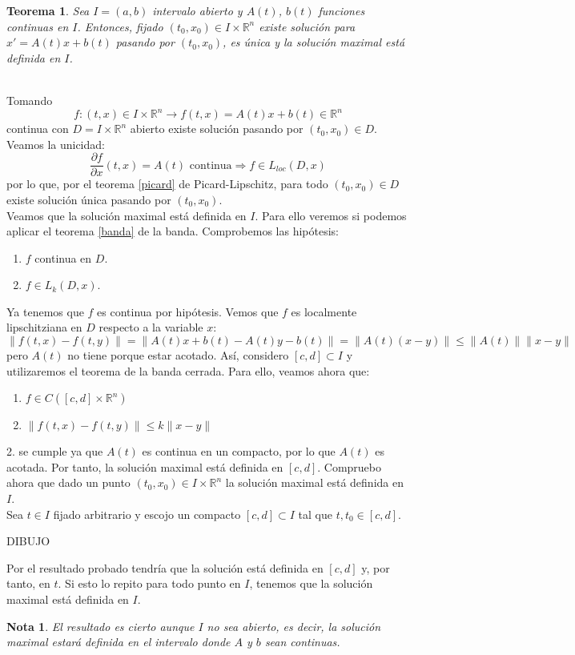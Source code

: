 \documentclass{article}
\makeatletter
\providecommand{\norm}[1]{\lVert#1\rVert}
\theoremstyle{theorem-style}  %
\newtheorem{theorem}{Teorema}[section]  %
\theoremstyle{definition-style}
\newtheorem*{note}{Nota} %
\theoremstyle{example-style}
\renewenvironment{proof}[1][\proofname]{\par
	\pushQED{\qed}%
	\normalfont \topsep6\p@\@plus6\p@\relax
	\list{}{%
		\settowidth{\leftmargin}{\quad:\hskip\labelsep}%
		\setlength{\labelwidth}{0pt}%
		\setlength{\itemindent}{-\leftmargin}%
	}%
	\item[\hskip\labelsep\itshape#1\@addpunct{:}]\ignorespaces
}{%
	\popQED\endlist\@endpefalse
}
\makeatother
\begin{document}
\begin{theorem}
	Sea $I = (a, b)$ intervalo abierto y $A(t)$, $b(t)$ funciones continuas en $I$. Entonces, fijado $(t_0, x_0) \in I \times \mathbb{R}^n$ existe solución para $x'= A(t)x + b(t)$ pasando por $(t_0, x_0)$, es única y la solución maximal está definida en $ I $.
\end{theorem}
\begin{proof}\ \\
	Tomando
	\[f:(t, x) \in I \times \mathbb{R}^n \longrightarrow f(t,x)=A(t)x+b(t)\in\mathbb{R}^n\]
	continua con $D = I \times \mathbb{R}^n$ abierto existe solución pasando por $(t_0, x_0) \in D$. Veamos la unicidad:
	\[\frac{\partial f}{\partial x} (t, x) = A(t) \text{ continua} \Rightarrow f \in L_{loc} (D, x)\]
	por lo que, por el teorema \ref{picard} de Picard-Lipschitz, para todo $ (t_0, x_0) \in D$ existe solución única pasando por $(t_0, x_0)$. \\
	Veamos que la solución maximal está definida en $I$. Para ello veremos si podemos aplicar el teorema \ref{banda} de la banda. Comprobemos las hipótesis:
	\begin{enumerate}
		\item $f$ continua en $D$.
		\item $f \in L_k (D, x)$.
	\end{enumerate}
	Ya tenemos que $f$ es continua por hipótesis. Vemos que $f$ es localmente lipschitziana en $D$ respecto a la variable $x$:
	\[\norm{f(t, x) - f(t, y)} = \norm{A(t)x + b(t) - A(t)y - b(t)} = \norm{A(t) (x-y)} \leq \norm{A(t)} \norm{x - y} \]
	pero $A(t)$ no tiene porque estar acotado. Así, considero $[c, d] \subset I$ y utilizaremos el teorema de la banda cerrada. Para ello, veamos ahora que:
	\begin{enumerate}
		\item $f \in C([c, d] \times \mathbb{R}^n)$
		\item $\norm{f(t, x) - f(t, y)} \leq k \norm{x - y}$
	\end{enumerate}
2. se cumple ya que $A(t)$ es continua en un compacto, por lo que $A(t)$ es acotada. Por tanto, la solución maximal está definida en $[c, d]$. Compruebo ahora que dado un punto $(t_0, x_0) \in I \times \mathbb{R}^n$ la solución maximal está definida en $I$. \\
	Sea $t \in I$ fijado arbitrario y escojo un compacto $[c, d]\subset I$ tal que $t, t_0 \in [c, d]$. \\
	\begin{center}
		DIBUJO
	\end{center}
	Por el resultado probado tendría que la solución está definida en $[c, d]$ y, por tanto, en $t$. Si esto lo repito para todo punto en $I$, tenemos que la solución maximal está definida en $I$.
\end{proof}
\begin{note}
	El resultado es cierto aunque $I$ no sea abierto, es decir, la solución maximal estará definida en el intervalo donde $A$ y $b$ sean continuas.
\end{note}
\end{document}
